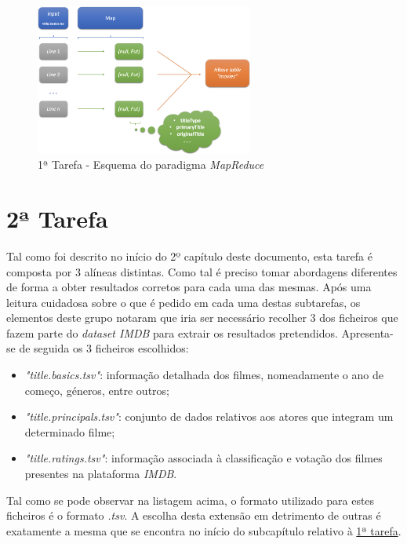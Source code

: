 \documentclass[a4paper]{report}
\begin{document}
{		\begin{figure}[H]
            \centering
            \includegraphics[width=0.64\textwidth]{Imagens/1ª Tarefa - Esquema MapReduce.png}
            \caption{1ª Tarefa - Esquema do paradigma \textit{MapReduce}}
            \label{fig:12}
        \end{figure}


	\section{2ª Tarefa} \label{sec:Task2}
	Tal como foi descrito no início do 2º capítulo deste documento, esta tarefa é composta por 3 alíneas distintas. Como tal é preciso tomar abordagens diferentes de forma a obter resultados corretos para cada uma das mesmas. 
	Após uma leitura cuidadosa sobre o que é pedido em cada uma destas subtarefas, os elementos deste grupo notaram que iria ser necessário recolher 3 dos ficheiros que fazem parte do \textit{dataset IMDB} para extrair os resultados pretendidos.
	Apresenta-se de seguida os 3 ficheiros escolhidos:
	\begin{itemize}
		\item \textit{"title.basics.tsv"}: informação detalhada dos filmes, nomeadamente o ano de começo, géneros, entre outros;
		\item \textit{"title.principals.tsv"}: conjunto de dados relativos aos atores que integram um determinado filme;
		\item \textit{"title.ratings.tsv"}: informação associada à classificação e votação dos filmes presentes na plataforma \textit{IMDB}.
	\end{itemize}
	
	Tal como se pode observar na listagem acima, o formato utilizado para estes ficheiros é o formato \textit{.tsv}. A escolha desta extensão em detrimento de outras é exatamente a mesma que se encontra no início do subcapítulo relativo à \hyperref[sec:Task1]{1ª tarefa}.
	
}
\end{document}
